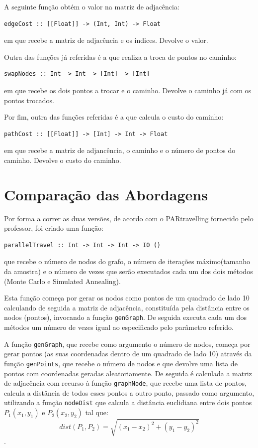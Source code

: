 \documentclass{article}
\begin{document}
A seguinte função obtém o valor na matriz de adjacência:
\begin{verbatim}
edgeCost :: [[Float]] -> (Int, Int) -> Float
\end{verbatim}
em que recebe a matriz de adjacência e os indices. Devolve o valor.

Outra das funções já referidas é a que realiza a troca de pontos no caminho:
\begin{verbatim}
swapNodes :: Int -> Int -> [Int] -> [Int]
\end{verbatim}
em que recebe os dois pontos a trocar e o caminho. Devolve o caminho já com os pontos trocados.

Por fim, outra das funções referidas é a que calcula o custo do caminho:
\begin{verbatim}
pathCost :: [[Float]] -> [Int] -> Int -> Float
\end{verbatim}
em que recebe a matriz de adjancência, o caminho e o número de pontos do caminho. Devolve o custo do caminho.

\section{Comparação das Abordagens}

Por forma a correr as duas versões, de acordo com o PARtravelling fornecido pelo professor, foi criado uma função:
\begin{verbatim}
parallelTravel :: Int -> Int -> Int -> IO ()
\end{verbatim}
que recebe o número de nodos do grafo, o número de iterações máximo(tamanho da amostra) e o número de vezes que serão executados cada um dos dois métodos (Monte Carlo 
e Simulated Annealing). 

Esta função começa por gerar os nodos como pontos de um quadrado de lado 10 calculando de seguida a matriz de adjacência, constituída pela distância entre
os nodos (pontos), invocando a função \texttt{genGraph}. De seguida executa cada um dos métodos um número de vezes igual ao especificado pelo parâmetro referido. 

A função \texttt{genGraph}, que recebe como argumento o número de nodos, começa por gerar pontos (as suas coordenadas dentro de um quadrado de lado 10) através da 
função \texttt{genPoints}, que recebe o número de nodos e que devolve uma lista de pontos com coordenadas geradas aleatoriamente. De seguida é calculada a matriz de 
adjacência com recurso à função \texttt{graphNode}, que recebe uma lista de pontos, calcula a distância de todos esses pontos a outro ponto, passado como argumento, utilizando a função \texttt{nodeDist} que calcula a distância euclidiana entre dois pontos $P_1 (x_1, y_1)$ e $P_2 (x_2, y_2)$ tal que: 
$$ dist(P_1, P_2) = \sqrt{(x_1-x_2)^2+(y_1-y_2)^2}$$.
\end{document}
